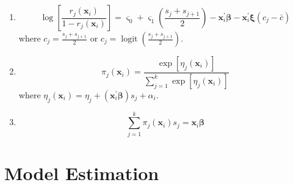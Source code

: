 \begin{enumerate}
    \item \begin{equation}
              \log\left[\frac{r_{j}\left(\mathbf{x}_{i}\right)}{1-r_{j}\left(\mathbf{x}_{i}\right)}\right]=\varsigma_{0}+\varsigma_{1}\left(\frac{s_{j}+s_{j+1}}{2}\right)-\mathbf{x}_{i}^{\prime}\boldsymbol{\beta}-\mathbf{x}_{i}^{\prime}\boldsymbol{\xi}\left(c_{j}-\bar{c}\right)
          \end{equation}
          where $c_{j}=\frac{s_{j}+s_{j+1}}{2}$ or $c_{j}=\operatorname{logit}\left(\frac{s_{j}+s_{j+1}}{2}\right)$.
    \item \begin{equation}
              \pi_{j}\left(\mathbf{x}_{i}\right)=\frac{\exp \left[\eta_{j}\left(\mathbf{x}_{i}\right)\right]}{\sum_{j=1}^{k} \exp \left[\eta_{j}\left(\mathbf{x}_{i}\right)\right]}
          \end{equation}
          where $\eta_{j}\left(\mathbf{x}_{i}\right)=\eta_{j}+\left(\mathbf{x}_{i}^{\prime}\boldsymbol{\beta}\right)s_{j}+\alpha_{i}$.
    \item \begin{equation}
              \sum_{j=1}^{k}\pi_{j}\left(\mathbf{x}_{i}\right)s_{j}=\mathbf{x}_{i}\boldsymbol{\beta}
          \end{equation}
\end{enumerate}

\section{Model Estimation}